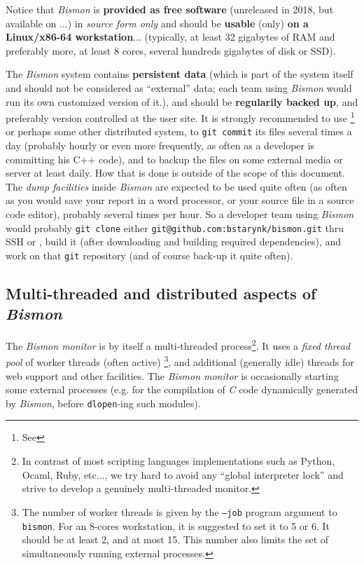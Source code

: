 Notice that \textit{Bismon} is \textbf{provided as free software}
(unreleased in 2018, but available on
 ...) in \emph{source form only} and
should be \textbf{usable} (only) \textbf{on a Linux/x86-64
  workstation}... (typically, at least 32 gigabytes of RAM and
preferably more, at least 8 cores, several hundreds gigabytes of disk
or SSD).

The \textit{Bismon} system contains \textbf{persistent data} (which is
part of the system itself and should not be considered as ``external''
data; each team using \textit{Bismon} would run its own customized
version of it.), and should be \textbf{regularily backed up}, and
preferably version controlled at the user site. It is strongly
recommended to use  \footnote{See
  } or perhaps some other distributed
 system, to \texttt{git
  commit} its files several times a day (probably hourly or even more
frequently, as often as a developer is committing his C++ code), and
to backup the files on some external media or server at least
daily. How that is done is outside of the scope of this document. The
\emph{dump facilities} inside \textit{Bismon} are expected to be used
quite often (as often as you would save your report in a word
processor, or your source file in a source code editor), probably
several times per hour. So a developer team using \textit{Bismon}
would probably \texttt{git clone} either
\texttt{git@github.com:bstarynk/bismon.git} thru SSH or
, build it (after
downloading and building required dependencies), and work on that
\texttt{git} repository (and of course back-up it quite often).


\subsection{Multi-threaded and distributed aspects of \textit{Bismon}}

The \textit{Bismon monitor} is by itself a multi-threaded
process\footnote{In contrast of most scripting languages
  implementations such as Python, Ocaml, Ruby, etc..., we try hard to
  avoid any ``global interpreter lock'' and strive to develop a
  genuinely multi-threaded monitor.}.  It uses a \emph{fixed thread
  pool} of worker threads (often active)
\footnote{The number of worker threads is given by the \texttt{--job}
  program argument to \texttt{bismon}. For an 8-cores workstation, it
  is suggested to set it to 5 or 6. It should be at least 2, and at
  most 15. This number also limits the set of simultaneously running
  external processes.}, and additional (generally idle) threads for
web support and other facilities. The \textit{Bismon monitor} is
occasionally starting some external processes (e.g. for the
compilation of \emph{C} code dynamically generated by \textit{Bismon},
before \texttt{dlopen}-ing such modules).

